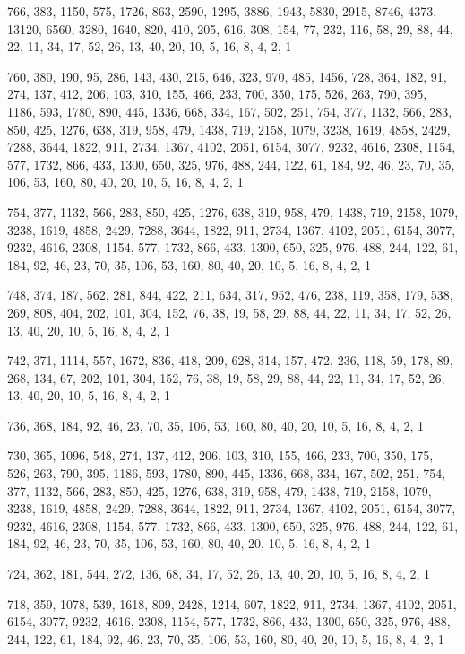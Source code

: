 \documentclass[12pt]{article}
\begin{document}
766, 383, 1150, 575, 1726, 863, 2590, 1295, 3886, 1943, 5830, 2915, 8746, 4373, 13120, 6560, 3280, 1640, 820, 410, 205, 616, 308, 154, 77, 232, 116, 58, 29, 88, 44, 22, 11, 34, 17, 52, 26, 13, 40, 20, 10, 5, 16, 8, 4, 2, 1

760, 380, 190, 95, 286, 143, 430, 215, 646, 323, 970, 485, 1456, 728, 364, 182, 91, 274, 137, 412, 206, 103, 310, 155, 466, 233, 700, 350, 175, 526, 263, 790, 395, 1186, 593, 1780, 890, 445, 1336, 668, 334, 167, 502, 251, 754, 377, 1132, 566, 283, 850, 425, 1276, 638, 319, 958, 479, 1438, 719, 2158, 1079, 3238, 1619, 4858, 2429, 7288, 3644, 1822, 911, 2734, 1367, 4102, 2051, 6154, 3077, 9232, 4616, 2308, 1154, 577, 1732, 866, 433, 1300, 650, 325, 976, 488, 244, 122, 61, 184, 92, 46, 23, 70, 35, 106, 53, 160, 80, 40, 20, 10, 5, 16, 8, 4, 2, 1

754, 377, 1132, 566, 283, 850, 425, 1276, 638, 319, 958, 479, 1438, 719, 2158, 1079, 3238, 1619, 4858, 2429, 7288, 3644, 1822, 911, 2734, 1367, 4102, 2051, 6154, 3077, 9232, 4616, 2308, 1154, 577, 1732, 866, 433, 1300, 650, 325, 976, 488, 244, 122, 61, 184, 92, 46, 23, 70, 35, 106, 53, 160, 80, 40, 20, 10, 5, 16, 8, 4, 2, 1

748, 374, 187, 562, 281, 844, 422, 211, 634, 317, 952, 476, 238, 119, 358, 179, 538, 269, 808, 404, 202, 101, 304, 152, 76, 38, 19, 58, 29, 88, 44, 22, 11, 34, 17, 52, 26, 13, 40, 20, 10, 5, 16, 8, 4, 2, 1

742, 371, 1114, 557, 1672, 836, 418, 209, 628, 314, 157, 472, 236, 118, 59, 178, 89, 268, 134, 67, 202, 101, 304, 152, 76, 38, 19, 58, 29, 88, 44, 22, 11, 34, 17, 52, 26, 13, 40, 20, 10, 5, 16, 8, 4, 2, 1

736, 368, 184, 92, 46, 23, 70, 35, 106, 53, 160, 80, 40, 20, 10, 5, 16, 8, 4, 2, 1

730, 365, 1096, 548, 274, 137, 412, 206, 103, 310, 155, 466, 233, 700, 350, 175, 526, 263, 790, 395, 1186, 593, 1780, 890, 445, 1336, 668, 334, 167, 502, 251, 754, 377, 1132, 566, 283, 850, 425, 1276, 638, 319, 958, 479, 1438, 719, 2158, 1079, 3238, 1619, 4858, 2429, 7288, 3644, 1822, 911, 2734, 1367, 4102, 2051, 6154, 3077, 9232, 4616, 2308, 1154, 577, 1732, 866, 433, 1300, 650, 325, 976, 488, 244, 122, 61, 184, 92, 46, 23, 70, 35, 106, 53, 160, 80, 40, 20, 10, 5, 16, 8, 4, 2, 1

724, 362, 181, 544, 272, 136, 68, 34, 17, 52, 26, 13, 40, 20, 10, 5, 16, 8, 4, 2, 1

718, 359, 1078, 539, 1618, 809, 2428, 1214, 607, 1822, 911, 2734, 1367, 4102, 2051, 6154, 3077, 9232, 4616, 2308, 1154, 577, 1732, 866, 433, 1300, 650, 325, 976, 488, 244, 122, 61, 184, 92, 46, 23, 70, 35, 106, 53, 160, 80, 40, 20, 10, 5, 16, 8, 4, 2, 1
\end{document}
